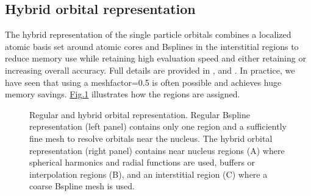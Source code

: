 \documentclass[letterpaper,10pt,english]{sphinxmanual}
\let\sphinxpxdimen\pdfpxdimen\else\newdimen\sphinxpxdimen
\begin{document}
\subsection{Hybrid orbital representation}
\label{\detokenize{intro_wavefunction:hybrid-orbital-representation}}\label{\detokenize{intro_wavefunction:spo-hybrid}}
The hybrid representation of the single particle orbitals combines a localized atomic basis set around atomic cores and B\sphinxhyphen{}splines in the interstitial regions to reduce memory use while retaining high evaluation speed and either retaining or increasing overall accuracy. Full details are provided in , and .
In practice, we have seen that using a meshfactor=0.5 is often possible and achieves huge memory savings.
\hyperref[\detokenize{intro_wavefunction:fig3}]{Fig.\@ \ref{\detokenize{intro_wavefunction:fig3}}} illustrates how the regions are assigned.

\begin{figure}[htbp]
\centering
\capstart

\noindent\sphinxincludegraphics[width=400\sphinxpxdimen]{{hybrid_new}.jpg}
\caption{Regular and hybrid orbital representation. Regular B\sphinxhyphen{}spline representation (left panel) contains only one region and a sufficiently fine mesh to resolve orbitals near the nucleus. The hybrid orbital representation (right panel) contains near nucleus regions (A) where spherical harmonics and radial functions are used, buffers or interpolation regions (B), and an interstitial region (C) where a coarse B\sphinxhyphen{}spline mesh is used.}\label{\detokenize{intro_wavefunction:id29}}\label{\detokenize{intro_wavefunction:fig3}}\end{figure}
\end{document}
